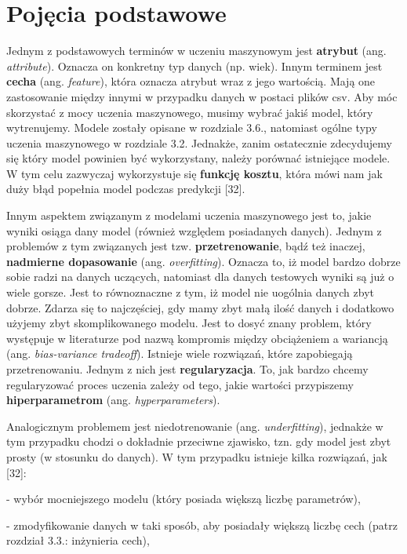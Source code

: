 \section{Pojęcia podstawowe}
\label{cha:cha3.1}

Jednym z podstawowych terminów w uczeniu maszynowym jest \textbf{atrybut} (ang. \textit{attribute}). Oznacza on konkretny typ danych (np. wiek). Innym terminem jest \textbf{cecha} (ang. \textit{feature}), która oznacza atrybut wraz z jego wartością. Mają one zastosowanie między innymi w przypadku danych w postaci plików csv. Aby móc skorzystać z mocy uczenia maszynowego, musimy wybrać jakiś model, który wytrenujemy. Modele zostały opisane w rozdziale 3.6., natomiast ogólne typy uczenia maszynowego w rozdziale 3.2. Jednakże, zanim ostatecznie zdecydujemy się który model powinien być wykorzystany, należy porównać istniejące modele. W tym celu zazwyczaj wykorzystuje się \textbf{funkcję kosztu}, która mówi nam jak duży błąd popełnia model podczas predykcji [32]. 

Innym aspektem związanym z modelami uczenia maszynowego jest to, jakie wyniki osiąga dany model (również względem posiadanych danych). Jednym z problemów z tym związanych jest tzw. \textbf{przetrenowanie}, bądź też inaczej, \textbf{nadmierne dopasowanie} (ang. \textit{overfitting}). Oznacza to, iż model bardzo dobrze sobie radzi na danych uczących, natomiast dla danych testowych wyniki są już o wiele gorsze. Jest to równoznaczne z tym, iż model nie uogólnia danych zbyt dobrze. Zdarza się to najczęściej, gdy mamy zbyt małą ilość danych i dodatkowo użyjemy zbyt skomplikowanego modelu. Jest to dosyć znany problem, który występuje w literaturze pod nazwą kompromis między obciążeniem a wariancją (ang. \textit{bias-variance tradeoff}). Istnieje wiele rozwiązań, które zapobiegają przetrenowaniu. Jednym z nich jest \textbf{regularyzacja}. To, jak bardzo chcemy regularyzować proces uczenia zależy od tego, jakie wartości przypiszemy \textbf{hiperparametrom} (ang. \textit{hyperparameters}). 

Analogicznym problemem jest niedotrenowanie (ang. \textit{underfitting}), jednakże w tym przypadku chodzi o dokładnie przeciwne zjawisko, tzn. gdy model jest zbyt prosty (w stosunku do danych). W tym przypadku istnieje kilka rozwiązań, jak [32]:

- wybór mocniejszego modelu (który posiada większą liczbę parametrów),

- zmodyfikowanie danych w taki sposób, aby posiadały większą liczbę cech (patrz rozdział 3.3.: inżynieria cech),

